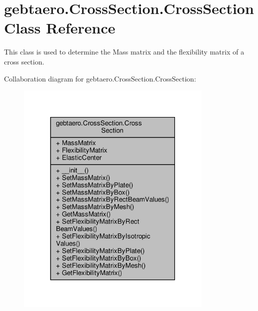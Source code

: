 \hypertarget{classgebtaero_1_1_cross_section_1_1_cross_section}{}\section{gebtaero.\+Cross\+Section.\+Cross\+Section Class Reference}
\label{classgebtaero_1_1_cross_section_1_1_cross_section}


This class is used to determine the Mass matrix and the flexibility matrix of a cross section.  




Collaboration diagram for gebtaero.\+Cross\+Section.\+Cross\+Section\+:\nopagebreak
\begin{figure}[H]
\begin{center}
\leavevmode
\includegraphics[width=266pt]{classgebtaero_1_1_cross_section_1_1_cross_section__coll__graph}
\end{center}
\end{figure}
